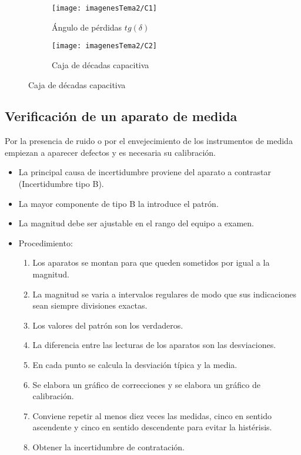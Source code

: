 \begin{itemize}
\begin{enumerate}
	\end{enumerate}
	
	\begin{figure}
	\begin{subfigure}{0.5\textwidth}
		\centering
		\texttt{[image: imagenesTema2/C1]}
		\caption{Ángulo de pérdidas $tg(\delta)$}
		\label{fig:c1}
	\end{subfigure}
	\begin{subfigure}{0.5\textwidth}
		\centering
		\texttt{[image: imagenesTema2/C2]}
		\caption{Caja de décadas capacitiva}
		\label{fig:c2}
	\end{subfigure}
\end{figure}	
\end{itemize}
\subsection{Verificación de un aparato de medida}
Por la presencia de ruido o por el envejecimiento de los instrumentos de medida empiezan a aparecer defectos y es necesaria su calibración.
\begin{itemize}
	\item La principal causa de incertidumbre proviene del aparato a contrastar (Incertidumbre tipo B).
	\item  La mayor componente de tipo B la introduce el patrón.
	\item La magnitud debe ser ajustable en el rango del equipo a examen.
	\item Procedimiento:
	\begin{enumerate}
		\item Los aparatos se montan para que queden sometidos por igual a la magnitud.
		\item La magnitud se varia a intervalos regulares de modo que sus indicaciones sean siempre divisiones exactas.
		\item Los valores del patrón son los verdaderos.
		\item La diferencia entre las lecturas de los aparatos son las desviaciones.
		\item En cada punto se calcula la desviación típica y la media.
		\item Se elabora un gráfico de correcciones y se elabora un gráfico de calibración.
		\item Conviene repetir al menos diez veces las medidas, cinco en sentido ascendente y cinco en sentido descendente para evitar la histérisis.
		\item Obtener la incertidumbre de contratación.
	\end{enumerate}
\end{itemize}
\newpage
